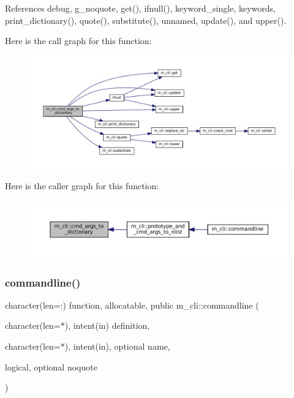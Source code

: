 References debug, g\+\_\+noquote, get(), ifnull(), keyword\+\_\+single, keywords, print\+\_\+dictionary(), quote(), substitute(), unnamed, update(), and upper().

Here is the call graph for this function\+:
\nopagebreak
\begin{figure}[H]
\begin{center}
\leavevmode
\includegraphics[width=350pt]{namespacem__cli_a89a63254465b02048f09541e51974764_cgraph}
\end{center}
\end{figure}
Here is the caller graph for this function\+:
\nopagebreak
\begin{figure}[H]
\begin{center}
\leavevmode
\includegraphics[width=350pt]{namespacem__cli_a89a63254465b02048f09541e51974764_icgraph}
\end{center}
\end{figure}
\mbox{\label{namespacem__cli_a4f639b0c4bf16930fc1c5858ed4196a3}} 
\subsubsection{\texorpdfstring{commandline()}{commandline()}}
{\footnotesize\ttfamily character(len=\+:) function, allocatable, public m\+\_\+cli\+::commandline (\begin{DoxyParamCaption}\item[{character(len=$\ast$), intent(in)}]{definition,  }\item[{character(len=$\ast$), intent(in), optional}]{name,  }\item[{logical, optional}]{noquote }\end{DoxyParamCaption})}



